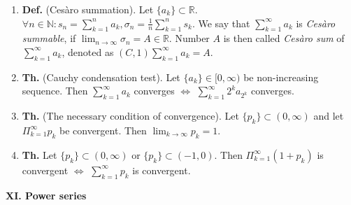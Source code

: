 \documentclass{article}
\newcommand{\<}{\left<}
\renewcommand{\>}{\right>}
\newcommand{\N}{\mathbb{N}}
\newcommand{\R}{\mathbb{R}}
\newcommand{\define}{\textbf{Def. }}
\newcommand{\theor}{\textbf{Th. }}
\begin{document}
\begin{multicols}{3}
\begin{enumerate}[itemsep=2pt, topsep=2pt, partopsep=2pt, parsep=2pt]
        \item \define (Cesàro summation). Let $\{a_k\}\subset\R$. $\forall n\in\N:s_n=\sum_{k=1}^na_k,\sigma_n=\frac{1}{n}\sum_{k=1}^ns_k$. We say that $\sum_{k=1}^\infty a_k$ is \emph{Cesàro summable}, if $\lim_{n\to\infty}\sigma_n=A\in\R$. Number $A$ is then called
        \emph{Cesàro sum} of $\sum_{k=1}^\infty a_k$, denoted as $(C,1)\sum_{k=1}^\infty a_k=A$.
        \item \theor (Cauchy condensation test). Let $\{a_k\}\in[0,\infty)$ be non-increasing sequence. Then $\sum_{k=1}^\infty a_k$ converges $\Leftrightarrow$ $\sum_{k=1}^\infty 2^ka_{2^k}$ converges.
        \item \theor (The necessary condition of convergence). Let $\{p_k\}\subset(0,\infty)$ and let $\Pi_{k=1}^\infty p_k$ be convergent. Then $\lim_{k\to\infty}p_k=1$.
        \item \theor Let $\{p_k\}\subset(0,\infty)$ or $\{p_k\}\subset(-1,0)$. Then $\Pi_{k=1}^\infty (1+p_k)$ is convergent $\Longleftrightarrow$ $\sum_{k=1}^\infty p_k$ is convergent.

    \end{enumerate}

    \textbf{XI. Power series}

    \begin{enumerate}[itemsep=2pt, topsep=2pt, partopsep=2pt, parsep=2pt]


\end{enumerate}
\end{multicols}
\end{document}
